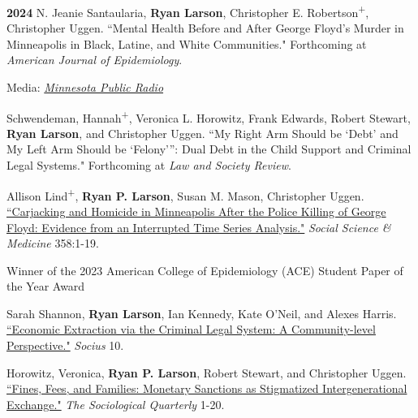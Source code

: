 \documentclass[letterpaper]{article}
\newenvironment{publist}{%
  \begin{list}{}{%
    \setlength{\leftmargin}{0cm}   %
    \setlength{\labelwidth}{2cm}     %
    \setlength{\labelsep}{0.5cm}     %
  }%
}{%
  \end{list}%
}
\renewenvironment{itemize}{
  \begin{list}{}{
    \setlength{\leftmargin}{1.5em}
  }
}{
  \end{list}
}
\begin{document}
\begin{publist}

\item[\textbf{2024}]  N. Jeanie Santaularia, \textbf{Ryan Larson}, Christopher E. Robertson\textsuperscript{+}, Christopher Uggen. ``Mental Health Before and After George Floyd’s Murder in Minneapolis in Black, Latine, and White Communities." Forthcoming at \textit{American Journal of Epidemiology}.

\begin{itemize}
\item Media: \href{https://www.mprnews.org/story/2024/09/19/black-minneapolis-residents-bear-heaviest-mental-health-burden-after-george-floyds-murder}{\textit{Minnesota Public Radio}}
\end{itemize}

\item Schwendeman, Hannah\textsuperscript{+}, Veronica L. Horowitz, Frank Edwards, Robert Stewart, \textbf{Ryan Larson}, and Christopher Uggen. ``My Right Arm Should be ‘Debt’ and My Left Arm Should be ‘Felony’”: Dual Debt in the Child Support and Criminal Legal Systems." Forthcoming at \textit{Law and Society Review}. 

\item Allison Lind\textsuperscript{+}, \textbf{Ryan P. Larson}, Susan M. Mason, Christopher Uggen. \href{https://ryanplarson.github.io/personal_site/pubs/lind_etal_24.pdf}{``Carjacking and Homicide in Minneapolis After the Police Killing of George Floyd:  Evidence from an Interrupted Time Series Analysis."} \textit{Social Science \& Medicine} 358:1-19.

\begin{itemize}
\item Winner of the 2023 American College of Epidemiology (ACE) Student Paper of the Year Award
\end{itemize}

\item Sarah Shannon, \textbf{Ryan Larson}, Ian Kennedy,  Kate O'Neil, and Alexes Harris. \href{https://ryanplarson.github.io/personal_site/pubs/shannon_etal_24.pdf}{``Economic Extraction via the Criminal Legal System: A Community-level Perspective."} \textit{Socius} 10. 

\item Horowitz, Veronica, \textbf{Ryan P. Larson}, Robert Stewart, and Christopher Uggen. \href{https://ryanplarson.github.io/personal_site/pubs/horowitz_etal_24.pdf}{``Fines, Fees, and Families: Monetary Sanctions as Stigmatized Intergenerational Exchange."} \textit{The Sociological Quarterly} 1-20.


\end{publist}
\end{document}
